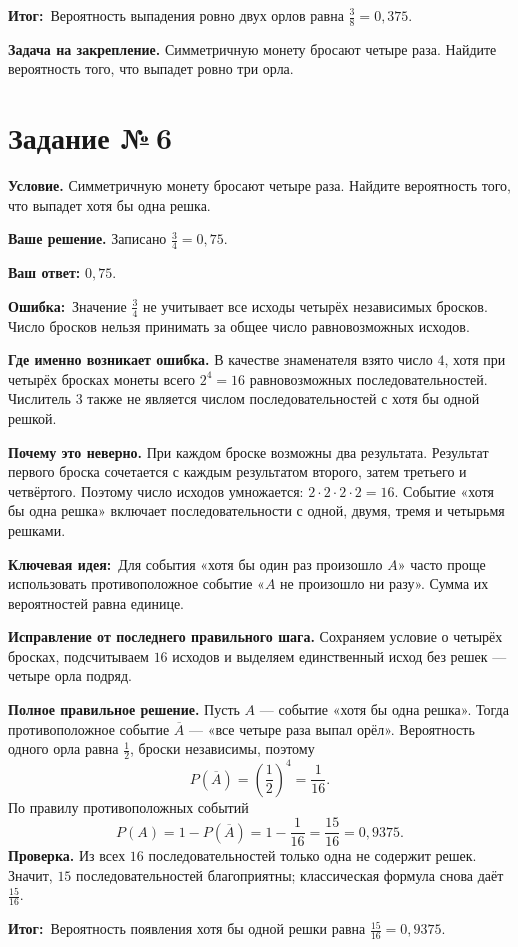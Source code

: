 \documentclass[a4paper,12pt]{article}
\newcommand{\errlabel}{\textcolor{err}{\textbf{Ошибка:}}}
\newcommand{\keylabel}{\textcolor{accent}{\textbf{Ключевая идея:}}}
\newcommand{\outcomelabel}{\textcolor{accent}{\textbf{Итог:}}}
\newcommand{\reviewtask}[1]{\clearpage\phantomsection\label{task:#1}\section*{\textcolor{accent}{Задание №\,#1}}}
\begin{document}
\outcomelabel\ Вероятность выпадения ровно двух орлов равна $\boxed{\frac38=0{,}375}$.

\textbf{Задача на закрепление.} Симметричную монету бросают четыре раза. Найдите вероятность того, что выпадет ровно три орла.

\reviewtask{6}
\textbf{Условие.} Симметричную монету бросают четыре раза. Найдите вероятность того, что выпадет хотя бы одна решка.

\textbf{Ваше решение.} Записано $\frac34=0{,}75$.

\textbf{Ваш ответ:} $0{,}75$.

\errlabel\ Значение $\frac34$ не учитывает все исходы четырёх независимых бросков. Число бросков нельзя принимать за общее число равновозможных исходов.

\textbf{Где именно возникает ошибка.} В качестве знаменателя взято число $4$, хотя при четырёх бросках монеты всего $2^4=16$ равновозможных последовательностей. Числитель $3$ также не является числом последовательностей с хотя бы одной решкой.

\textbf{Почему это неверно.} При каждом броске возможны два результата. Результат первого броска сочетается с каждым результатом второго, затем третьего и четвёртого. Поэтому число исходов умножается: $2\cdot2\cdot2\cdot2=16$. Событие «хотя бы одна решка» включает последовательности с одной, двумя, тремя и четырьмя решками.

\keylabel\ Для события «хотя бы один раз произошло $A$» часто проще использовать противоположное событие «$A$ не произошло ни разу». Сумма их вероятностей равна единице.

\textbf{Исправление от последнего правильного шага.} Сохраняем условие о четырёх бросках, подсчитываем $16$ исходов и выделяем единственный исход без решек --- четыре орла подряд.

\textbf{Полное правильное решение.} Пусть $A$ --- событие «хотя бы одна решка». Тогда противоположное событие $\overline A$ --- «все четыре раза выпал орёл». Вероятность одного орла равна $\frac12$, броски независимы, поэтому
\[
P(\overline A)=\left(\frac12\right)^4=\frac1{16}.
\]
По правилу противоположных событий
\[
P(A)=1-P(\overline A)=1-\frac1{16}=\frac{15}{16}=0{,}9375.
\]
\textbf{Проверка.} Из всех $16$ последовательностей только одна не содержит решек. Значит, $15$ последовательностей благоприятны; классическая формула снова даёт $\frac{15}{16}$.

\outcomelabel\ Вероятность появления хотя бы одной решки равна $\boxed{\frac{15}{16}=0{,}9375}$.
\end{document}
